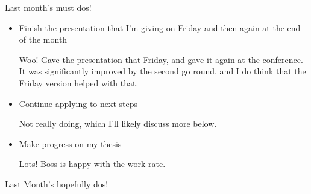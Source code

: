 \documentclass[12pt]{article}
\renewcommand{\,}{\textsuperscript{,}}
\begin{document}
Last month's must dos!

\begin{itemize}

\item Finish the presentation that I'm giving on Friday and then again at the end of the month

Woo! Gave the presentation that Friday, and gave it again at the conference. It was significantly improved by the second go round, and I do think that the Friday version helped with that.

\item Continue applying to next steps

Not really doing, which I'll likely discuss more below.

\item Make progress on my thesis

Lots! Boss is happy with the work rate.

\end{itemize}

Last Month's hopefully dos!
\end{document}
